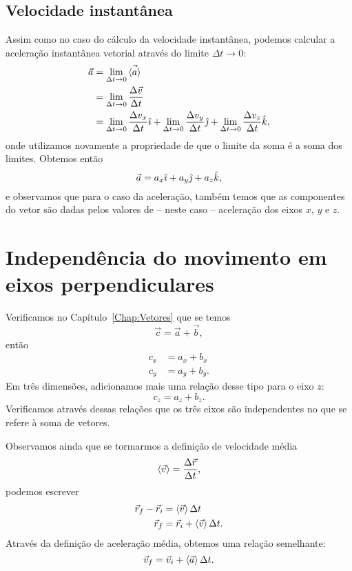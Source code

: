 \subsection{Velocidade instantânea}

Assim como no caso do cálculo da velocidade instantânea, podemos calcular a aceleração instantânea vetorial através do limite $\Delta t \to 0$:
\begin{align}
  \vec{a} &= \lim_{\Delta t \to 0} \vec{\left\langle{a}\right\rangle} \\
  &= \lim_{\Delta t \to 0} \frac{\Delta \vec{v}}{\Delta t} \\
  &= \lim_{\Delta t \to 0} \frac{\Delta {v_x}}{\Delta t}\hat{\imath} + \lim_{\Delta t \to 0} \frac{\Delta {v_y}}{\Delta t}\hat{\jmath} + \lim_{\Delta t \to 0} \frac{\Delta {v_z}}{\Delta t}\hat{k},
\end{align}
%
onde utilizamos novamente a propriedade de que o limite da soma é a soma dos limites. Obtemos então
\begin{equation}
  \vec{a} = a_x \hat{\imath} + a_y \hat{\jmath} + a_z \hat{k},
\end{equation}
%
e observamos que para o caso da aceleração, também temos que as componentes do vetor são dadas pelos valores de -- neste caso -- aceleração dos eixos $x$, $y$ e $z$.

\section{Independência do movimento em eixos perpendiculares}

Verificamos no Capítulo~\ref{Chap:Vetores} que se temos
\begin{equation}
    \vec{c} = \vec{a} + \vec{b},
\end{equation}
%
então
\begin{align}
    c_x &= a_x + b_x \\
    c_y &= a_y + b_y.
\end{align}
%
Em três dimensões, adicionamos mais uma relação desse tipo para o eixo $z$:
\begin{equation}
    c_z = a_z + b_z.
\end{equation}
%
Verificamos através dessas relações que os três eixos são independentes no que se refere à soma de vetores.

Observamos ainda que se tormarmos a definição de velocidade média
\begin{equation}
    \left\langle{\vec{v}}\right\rangle = \frac{\Delta \vec{r}}{\Delta t},
\end{equation}
%
podemos escrever
\begin{align}
    \vec{r}_f - \vec{r}_i &= \left\langle{\vec{v}}\right\rangle \Delta t \\
    \vec{r}_f &= \vec{r}_i + \left\langle{\vec{v}}\right\rangle \Delta t.
\end{align}
%
Através da definição de aceleração média, obtemos uma relação semelhante:
\begin{equation}
    \vec{v}_f = \vec{v}_i + \left\langle{\vec{a}}\right\rangle \Delta t.
\end{equation}

